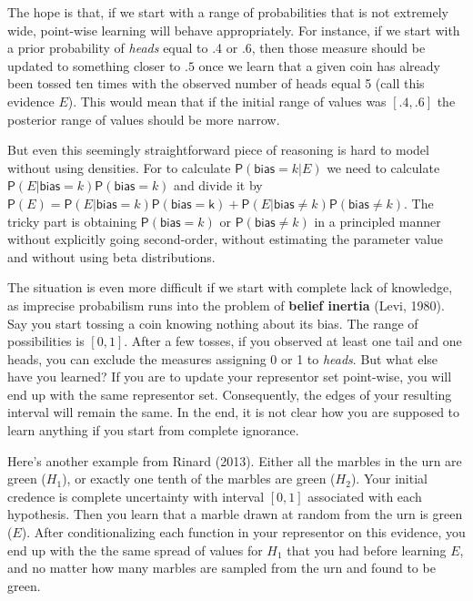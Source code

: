 \documentclass[
  10pt,
  dvipsnames,enabledeprecatedfontcommands]{scrartcl}
\newcommand{\pr}[1]{\mathsf{P}(#1)}
\newcommand{\s}[1]{\mbox{$\mathsf{#1}$}}
\begin{document}
\noindent The hope is that, if we start with a range of probabilities
that is not extremely wide, point-wise learning will behave
appropriately. For instance, if we start with a prior probability of
\emph{heads} equal to .4 or .6, then those measure should be updated to
something closer to \(.5\) once we learn that a given coin has already
been tossed ten times with the observed number of heads equal 5 (call
this evidence \(E\)). This would mean that if the initial range of
values was \([.4,.6]\) the posterior range of values should be more
narrow.

But even this seemingly straightforward piece of reasoning is hard to
model without using densities. For to calculate
\(\pr{\s{bias} = k \vert E}\) we need to calculate
\(\pr{E \vert \s{bias} = k }\pr{\s{bias} = k}\) and divide it by
\(\pr{E} = \pr{E \vert \s{bias} = k }\pr{\s{bias = k}} + \pr{E \vert \s{bias} \neq k }\pr{ \s{bias} \neq k}\).
The tricky part is obtaining \(\pr{\s{bias} = k}\) or
\(\pr{ \s{bias} \neq k}\) in a principled manner without explicitly
going second-order, without estimating the parameter value and without
using beta distributions.

The situation is even more difficult if we start with complete lack of
knowledge, as imprecise probabilism runs into the problem of
\textbf{belief inertia} (Levi, 1980). Say you start tossing a coin
knowing nothing about its bias. The range of possibilities is \([0,1]\).
After a few tosses, if you observed at least one tail and one heads, you
can exclude the measures assigning 0 or 1 to \emph{heads}. But what else
have you learned? If you are to update your representor set point-wise,
you will end up with the same representor set. Consequently, the edges
of your resulting interval will remain the same. In the end, it is not
clear how you are supposed to learn anything if you start from complete
ignorance.

Here's another example from Rinard (2013). Either all the marbles in the
urn are green (\(H_1\)), or exactly one tenth of the marbles are green
(\(H_2\)). Your initial credence is complete uncertainty with interval
\([0,1]\) associated with each hypothesis. Then you learn that a marble
drawn at random from the urn is green (\(E\)). After conditionalizing
each function in your representor on this evidence, you end up with the
the same spread of values for \(H_1\) that you had before learning
\(E\), and no matter how many marbles are sampled from the urn and found
to be green.
\end{document}
